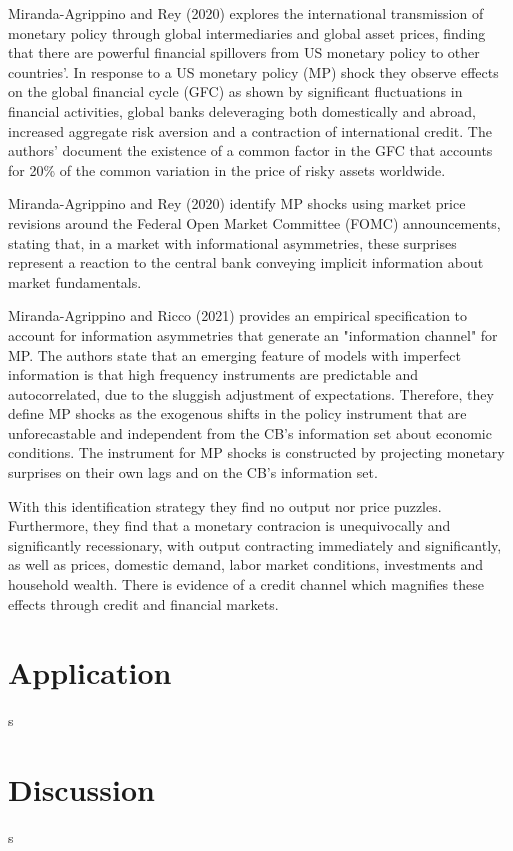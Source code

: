 \documentclass[10pt,a4paper,draft]{article}
\begin{document}
Miranda-Agrippino and Rey (2020) explores the international transmission of monetary policy through global intermediaries and global asset prices, finding that there are powerful financial spillovers from US monetary policy to other countries'. In response to a US monetary policy (MP) shock they observe effects on the global financial cycle (GFC) as shown by significant fluctuations in financial activities, global banks deleveraging both domestically and abroad, increased aggregate risk aversion and a contraction of international credit. The authors' document the existence of a common factor in the GFC that accounts for 20\% of the common variation in the price of risky assets worldwide.

Miranda-Agrippino and Rey (2020) identify MP shocks using market price revisions around the Federal Open Market Committee (FOMC) announcements, stating that, in a market with informational asymmetries, these surprises represent a reaction to the central bank conveying implicit information about market fundamentals.


Miranda-Agrippino and Ricco (2021) provides an empirical specification to account for information asymmetries that generate an "information channel" for MP. The authors state that an emerging feature of models with imperfect information is that high frequency instruments are predictable and autocorrelated, due to the sluggish adjustment of expectations. 
Therefore, they define MP shocks as the exogenous shifts in the policy instrument that are unforecastable and independent from the CB's information set about economic conditions. The instrument for MP shocks is constructed by projecting monetary surprises on their own lags and on the CB's information set. 

With this identification strategy they find no output nor price puzzles. Furthermore, they find that a monetary contracion is unequivocally and significantly recessionary, with output contracting immediately and significantly, as well as prices, domestic demand, labor market conditions, investments and household wealth. There is evidence of a credit channel which magnifies these effects through credit and financial markets. 






\section{Application}
s


\section{Discussion}
s
\end{document}
